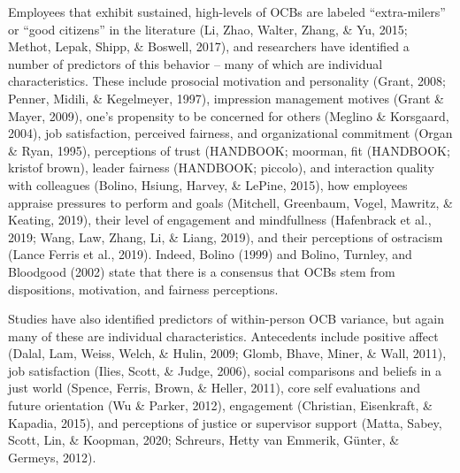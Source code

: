 \documentclass[english,,man]{apa6}
\theoremstyle{definition}
\theoremstyle{definition}
\theoremstyle{definition}
\theoremstyle{remark}
\begin{document}
Employees that exhibit sustained, high-levels of OCBs are labeled
\enquote{extra-milers} or \enquote{good citizens} in the literature (Li,
Zhao, Walter, Zhang, \& Yu, 2015; Methot, Lepak, Shipp, \& Boswell,
2017), and researchers have identified a number of predictors of this
behavior -- many of which are individual characteristics. These include
prosocial motivation and personality (Grant, 2008; Penner, Midili, \&
Kegelmeyer, 1997), impression management motives (Grant \& Mayer, 2009),
one's propensity to be concerned for others (Meglino \& Korsgaard,
2004), job satisfaction, perceived fairness, and organizational
commitment (Organ \& Ryan, 1995), perceptions of trust (HANDBOOK;
moorman, fit (HANDBOOK; kristof brown), leader fairness (HANDBOOK;
piccolo), and interaction quality with colleagues (Bolino, Hsiung,
Harvey, \& LePine, 2015), how employees appraise pressures to perform
and goals (Mitchell, Greenbaum, Vogel, Mawritz, \& Keating, 2019), their
level of engagement and mindfullness (Hafenbrack et al., 2019; Wang,
Law, Zhang, Li, \& Liang, 2019), and their perceptions of ostracism
(Lance Ferris et al., 2019). Indeed, Bolino (1999) and Bolino, Turnley,
and Bloodgood (2002) state that there is a consensus that OCBs stem from
dispositions, motivation, and fairness perceptions.

Studies have also identified predictors of within-person OCB variance,
but again many of these are individual characteristics. Antecedents
include positive affect (Dalal, Lam, Weiss, Welch, \& Hulin, 2009;
Glomb, Bhave, Miner, \& Wall, 2011), job satisfaction (Ilies, Scott, \&
Judge, 2006), social comparisons and beliefs in a just world (Spence,
Ferris, Brown, \& Heller, 2011), core self evaluations and future
orientation (Wu \& Parker, 2012), engagement (Christian, Eisenkraft, \&
Kapadia, 2015), and perceptions of justice or supervisor support (Matta,
Sabey, Scott, Lin, \& Koopman, 2020; Schreurs, Hetty van Emmerik,
Günter, \& Germeys, 2012).
\end{document}
